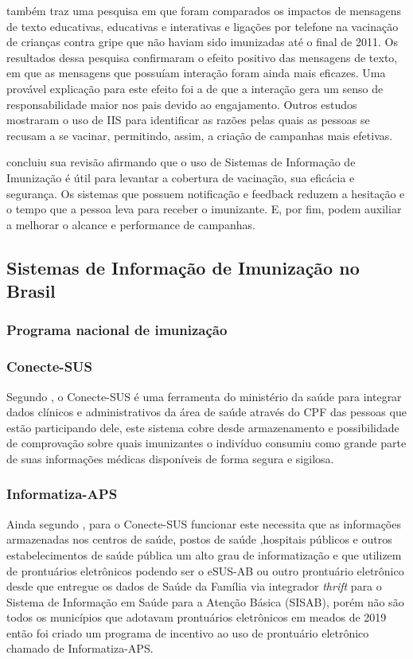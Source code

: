     \cite{gianfredi_countering_2019} também traz uma pesquisa em que foram comparados os impactos de mensagens de texto educativas, educativas e interativas e ligações por telefone na vacinação de crianças contra gripe que não haviam sido imunizadas até o final de 2011. Os resultados dessa pesquisa confirmaram o efeito positivo das mensagens de texto, em que as mensagens que possuíam interação foram ainda mais eficazes. Uma provável explicação para este efeito foi a de que a interação gera um senso de responsabilidade maior nos pais devido ao engajamento. Outros estudos mostraram o uso de IIS para identificar as razões pelas quais as pessoas se recusam a se vacinar, permitindo, assim, a criação de campanhas mais efetivas.
    
    \cite{gianfredi_countering_2019} concluiu sua revisão afirmando que o uso de Sistemas de Informação de Imunização é útil para levantar a cobertura de vacinação, sua eficácia e segurança. Os sistemas que possuem notificação e feedback reduzem a hesitação e o tempo que a pessoa leva para receber o imunizante. E, por fim, podem auxiliar a melhorar o alcance e performance de campanhas.
    
    \subsection{Sistemas de Informação de Imunização no Brasil}
        
        \subsubsection{Programa nacional de imunização}
        
        
        \subsubsection{Conecte-SUS}
        Segundo \cite{harzheim_bases_2020}, o Conecte-SUS é uma ferramenta do ministério da saúde para integrar dados clínicos e administrativos da área de saúde através do CPF das pessoas que estão participando dele, este sistema cobre desde armazenamento e possibilidade de comprovação sobre quais imunizantes o indivíduo consumiu como grande parte de suas informações médicas disponíveis de forma segura e sigilosa.

        \subsubsection{Informatiza-APS}
        Ainda segundo \cite{harzheim_bases_2020}, para o Conecte-SUS funcionar este necessita que as informações armazenadas nos centros de saúde, postos de saúde ,hospitais públicos e outros estabelecimentos de saúde pública um alto grau de informatização e que utilizem de prontuários eletrônicos podendo ser o eSUS-AB ou outro prontuário eletrônico desde que entregue os dados de Saúde da Família via integrador \textit{thrift} para o Sistema de Informação em Saúde para a Atenção Básica (SISAB), porém não são todos os municípios que adotavam prontuários eletrônicos em meados de 2019 então foi criado um programa de incentivo ao uso de prontuário eletrônico chamado de Informatiza-APS.
